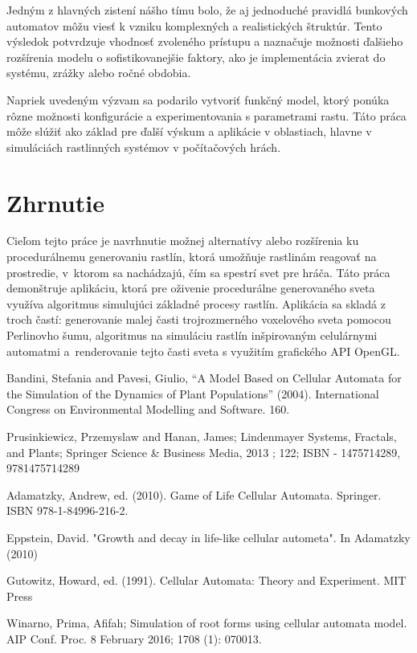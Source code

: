 \documentclass[12pt]{article}
\begin{document}
Jedným z hlavných zistení nášho tímu bolo, že aj jednoduché pravidlá bunkových automatov
môžu viesť k vzniku komplexných a realistických štruktúr. Tento výsledok
potvrdzuje vhodnosť zvoleného prístupu a naznačuje možnosti ďalšieho rozšírenia
modelu o sofistikovanejšie faktory, ako je implementácia zvierat do systému,
zrážky alebo ročné obdobia.

Napriek uvedeným výzvam sa podarilo vytvoriť funkčný model, ktorý ponúka rôzne
možnosti konfigurácie a experimentovania s parametrami rastu. Táto práca môže
slúžiť ako základ pre ďalší výskum a aplikácie v oblastiach, hlavne v simuláciách
rastlinných systémov v počítačových hrách.


\section{Zhrnutie}

Cieľom tejto práce je navrhnutie možnej alternatívy alebo rozšírenia
ku procedurálnemu generovaniu rastlín, ktorá umožňuje rastlinám reagovať na
prostredie, v~ktorom sa nachádzajú, čím sa spestrí svet pre hráča. Táto práca
demonštruje aplikáciu, ktorá pre oživenie procedurálne
generovaného sveta využíva algoritmus simulujúci základné procesy rastlín.
Aplikácia sa skladá z troch častí: generovanie malej časti trojrozmerného
voxelového sveta pomocou Perlinovho šumu, algoritmus na simuláciu rastlín
inšpirovaným celulárnymi automatmi a~renderovanie tejto časti sveta s
využitím grafického API OpenGL.


\renewcommand\refname{Zoznam použitej literatúry}
\begin{thebibliography}{99}
	\addcontentsline{toc}{section}{\refname}

	Bandini, Stefania and Pavesi, Giulio,
	``A Model Based on Cellular Automata for the Simulation of the Dynamics of Plant Populations''
	(2004). International Congress on Environmental Modelling and Software. 160.

	Prusinkiewicz, Przemyslaw and Hanan, James; Lindenmayer Systems, Fractals, and Plants;
	Springer Science \& Business Media, 2013 ; 122; ISBN - 1475714289, 9781475714289

	Adamatzky, Andrew, ed. (2010). Game of Life Cellular Automata. Springer.
	ISBN 978-1-84996-216-2.

	Eppstein, David. "Growth and decay in life-like cellular autometa". In Adamatzky (2010)

	Gutowitz, Howard, ed. (1991). Cellular Automata: Theory and Experiment. MIT Press

	Winarno, Prima, Afifah;
	Simulation of root forms using cellular automata model.
	AIP Conf. Proc. 8 February 2016; 1708 (1): 070013.

\end{thebibliography}
\end{document}
